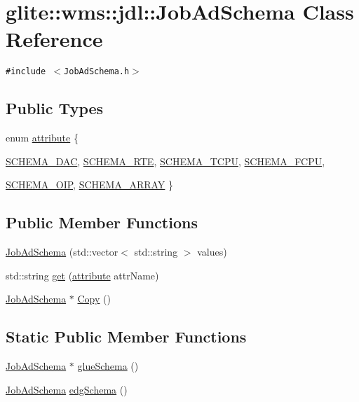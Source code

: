 \hypertarget{classglite_1_1wms_1_1jdl_1_1JobAdSchema}{
\section{glite::wms::jdl::Job\-Ad\-Schema Class Reference}
\label{classglite_1_1wms_1_1jdl_1_1JobAdSchema}
}
{\tt \#include $<$Job\-Ad\-Schema.h$>$}

\subsection*{Public Types}
\begin{CompactItemize}
\item 
enum \hyperlink{classglite_1_1wms_1_1jdl_1_1JobAdSchema_w6}{attribute} \{ \par
\hyperlink{classglite_1_1wms_1_1jdl_1_1JobAdSchema_w6w0}{SCHEMA\_\-DAC}, 
\hyperlink{classglite_1_1wms_1_1jdl_1_1JobAdSchema_w6w1}{SCHEMA\_\-RTE}, 
\hyperlink{classglite_1_1wms_1_1jdl_1_1JobAdSchema_w6w2}{SCHEMA\_\-TCPU}, 
\hyperlink{classglite_1_1wms_1_1jdl_1_1JobAdSchema_w6w3}{SCHEMA\_\-FCPU}, 
\par
\hyperlink{classglite_1_1wms_1_1jdl_1_1JobAdSchema_w6w4}{SCHEMA\_\-OIP}, 
\hyperlink{classglite_1_1wms_1_1jdl_1_1JobAdSchema_w6w5}{SCHEMA\_\-ARRAY}
 \}
\end{CompactItemize}
\subsection*{Public Member Functions}
\begin{CompactItemize}
\item 
\hyperlink{classglite_1_1wms_1_1jdl_1_1JobAdSchema_a0}{Job\-Ad\-Schema} (std::vector$<$ std::string $>$ values)
\item 
std::string \hyperlink{classglite_1_1wms_1_1jdl_1_1JobAdSchema_a1}{get} (\hyperlink{classglite_1_1wms_1_1jdl_1_1JobAdSchema_w6}{attribute} attr\-Name)
\item 
\hyperlink{classglite_1_1wms_1_1jdl_1_1JobAdSchema}{Job\-Ad\-Schema} $\ast$ \hyperlink{classglite_1_1wms_1_1jdl_1_1JobAdSchema_a2}{Copy} ()
\end{CompactItemize}
\subsection*{Static Public Member Functions}
\begin{CompactItemize}
\item 
\hyperlink{classglite_1_1wms_1_1jdl_1_1JobAdSchema}{Job\-Ad\-Schema} $\ast$ \hyperlink{classglite_1_1wms_1_1jdl_1_1JobAdSchema_e0}{glue\-Schema} ()
\item 
\hyperlink{classglite_1_1wms_1_1jdl_1_1JobAdSchema}{Job\-Ad\-Schema} \hyperlink{classglite_1_1wms_1_1jdl_1_1JobAdSchema_e1}{edg\-Schema} ()
\end{CompactItemize}


